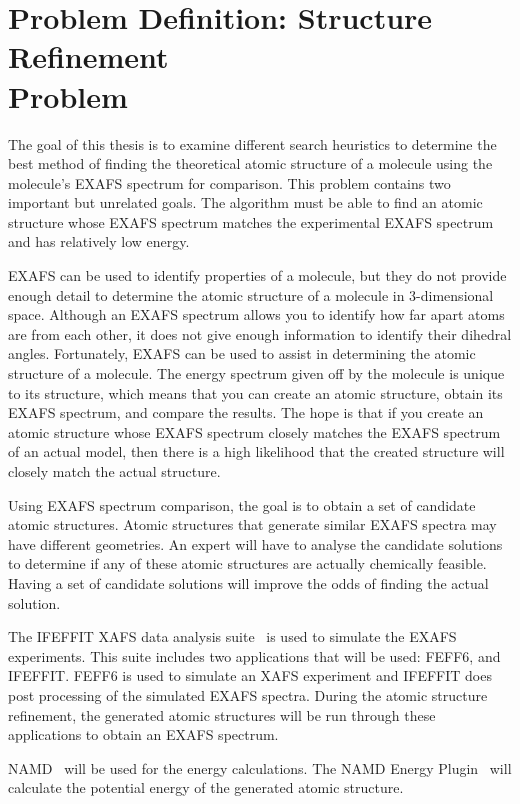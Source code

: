 \section[Problem Definition: Structure Refinement Problem]{Problem Definition: Structure Refinement\\ Problem}
\label{sec:problem-definition}

The goal of this thesis is to examine different search heuristics to determine the best method of finding the theoretical atomic structure of a molecule using the molecule's EXAFS spectrum for comparison. This problem contains two important but unrelated goals. The algorithm must be able to find an atomic structure whose EXAFS spectrum matches the experimental EXAFS spectrum and has relatively low energy.

EXAFS can be used to identify properties of a molecule, but they do not provide enough detail to determine the atomic structure of a molecule in 3-dimensional space. Although an EXAFS spectrum allows you to identify how far apart atoms are from each other, it does not give enough information to identify their dihedral angles. Fortunately, EXAFS can be used to assist in determining the atomic structure of a molecule. The energy spectrum given off by the molecule is unique to its structure, which means that you can create an atomic structure, obtain its EXAFS spectrum, and compare the results. The hope is that if you create an atomic structure whose EXAFS spectrum closely matches the EXAFS spectrum of an actual model, then there is a high likelihood that the created structure will closely match the actual structure.

Using EXAFS spectrum comparison, the goal is to obtain a set of candidate atomic structures. Atomic structures that generate similar EXAFS spectra may have different geometries. An expert will have to analyse the candidate solutions to determine if any of these atomic structures are actually chemically feasible. Having a set of candidate solutions will improve the odds of finding the actual solution.

The IFEFFIT XAFS data analysis suite~\cite{ifeffit} is used to simulate the EXAFS experiments. This suite includes two applications that will be used: FEFF6, and IFEFFIT. FEFF6 is used to simulate an XAFS experiment and IFEFFIT does post processing of the simulated EXAFS spectra. During the atomic structure refinement, the generated atomic structures will be run through these applications to obtain an EXAFS spectrum.

NAMD~\cite{namd} will be used for the energy calculations. The NAMD Energy Plugin~\cite{namdEnergy}  will calculate the potential energy of the generated atomic structure.

